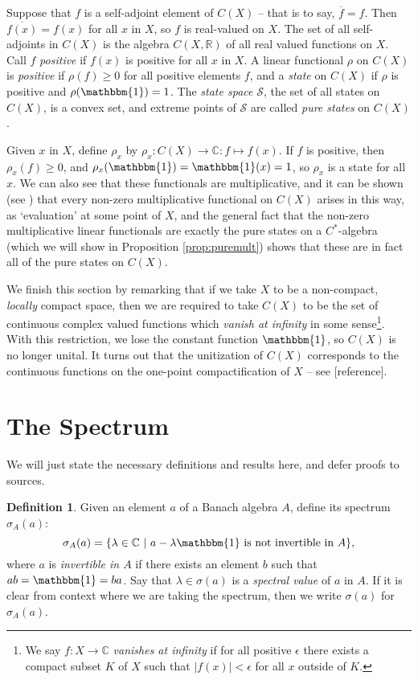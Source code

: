 \documentclass[12pt,a4paper]{report}
\theoremstyle{plain}
\theoremstyle{definition}
\newtheorem{defn}{Definition}
\newcommand{\1}{\mathbbm{1}}
\newcommand{\C}{\mathbb{C}}
\newcommand{\R}{\mathbb{R}}
\newcommand{\CX}{C(X)}
\renewcommand{\S}{\mathscr{S}}
\newcommand{\spec}[1]{\sigma(#1)}
\renewcommand{\bar}{\overline}
\begin{document}
Suppose that $f$ is a self-adjoint element of $\CX$ -- that is to say, $\bar f = f$. Then $\bar{f(x)} = 
f(x)$ for all $x$ in $X$, so $f$ is real-valued on $X$. The set of all self-adjoints in $\CX$ is the 
algebra $C(X,\R)$ of all real valued functions on $X$. Call $f$ \emph{positive} if $f(x)$ is positive 
for all $x$ in $X$. 
A linear functional $\rho$ on $\CX$ is \emph{positive} if $\rho(f)\geq 0$ for all positive elements $f$, 
and a \emph{state} on $\CX$ if $\rho$ is positive and $\rho(\1)=1$. The \emph{state space} $\S$, the set 
of all states on $\CX$, is a convex set, and extreme points of $\S$ are called \emph{pure states} on 
$\CX$.

Given $x$ in $X$, define $\rho_x$ by $\rho_x:\CX\to\C:f\mapsto f(x)$. If $f$ is positive, then 
$\rho_x(f) \geq 0$, and $\rho_x(\1) = \1(x)=1$, so $\rho_x$ is a state for all $x$. We can also see that 
these functionals are multiplicative, and it can be shown (see \cite[Corollary 3.4.2]{kadison83}) that 
every non-zero multiplicative functional on $\CX$ arises in this way, as `evaluation' at some point of 
$X$, and the general fact that the non-zero multiplicative linear functionals are exactly the pure 
states on a $C^\ast$-algebra (which we will show in Proposition \ref{prop:puremult}) shows that these 
are in fact all of the pure states on $\CX$.

We finish this section by remarking that if we take $X$ to be a non-compact, \emph{locally} compact 
space, then we are required to take $\CX$ to be the set of continuous complex valued functions which 
\emph{vanish at infinity} in some sense\footnote
{We say $f:X\to\C$ \emph{vanishes at infinity} if for all positive $\epsilon$ there exists a compact 
subset $K$ of $X$ such that $|f(x)|<\epsilon$ for all $x$ outside of $K$.}. 
With this restriction, we lose the constant function $\1$, so $\CX$ is no longer unital. 
It turns out that the unitization of $\CX$ corresponds to the continuous functions on the one-point 
compactification of $X$ -- see [reference].



\section{The Spectrum}
We will just state the necessary definitions and results here, and defer proofs to sources.

\begin{defn}
	Given an element $a$ of a Banach algebra $A$, define its spectrum $\sigma_A(a)$:
	\[
		\sigma_A(a)=\{\lambda\in \C ~|~ a-\lambda\1 \mbox{ is not invertible in }A\},
	\]
	where $a$ is \emph{invertible in $A$} if there exists an element $b$ such that $ab=\1=ba$. 
	Say that $\lambda\in\spec a$ is a \emph{spectral value} of $a$ in $A$. If it is clear from context 
	where we are taking the spectrum, then we write $\spec{a}$ for $\sigma_A(a)$. 
\end{defn}
\end{document}
